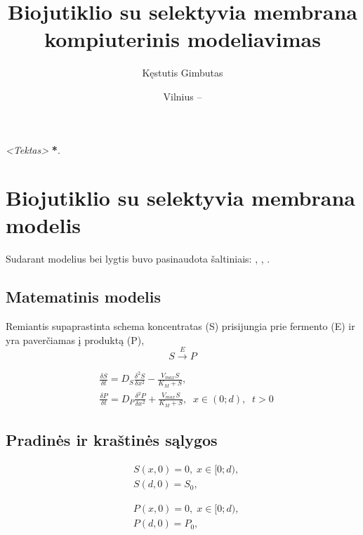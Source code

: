 \documentclass[12pt, a4paper, lithuanian]{article}
\title{Biojutiklio su selektyvia membrana kompiuterinis modeliavimas}
\author{
   Kęstutis Gimbutas
}
\date{Vilnius – \the\year}
\begin{document}
\sloppy
\maketitle

\tableofcontents

\textit{<Tektas>} \textbf{*}.

\section{Biojutiklio su selektyvia membrana modelis}
Sudarant modelius bei lygtis buvo pasinaudota šaltiniais:
\cite{baronas2009mathematical}, \cite{baronas2006computational},
\cite{baronas2003influence}.

\subsection{Matematinis modelis}
Remiantis supaprastinta schema koncentratas (S) prisijungia prie fermento (E)
ir yra
paverčiamas į produktą (P),
\begin{equation}\label{eq:basic} 
    S \overset{E}{\rightarrow} P
\end{equation}

\begin{equation}
\begin{aligned} 
    &\frac{\delta S}{\delta t} = D_S \frac{\delta^2 S}{\delta x^2} -
    \frac{V_{max} S}{K_M + S},\\ 
    &\frac{\delta P}{\delta t} = D_P \frac{\delta^2 P}{\delta x^2} +
    \frac{V_{max} S}{K_M + S} ,\;\; x \in (0; d),\;\; t > 0
\end{aligned}
\end{equation}


\subsection{Pradinės ir kraštinės sąlygos}
\begin{equation}
\begin{aligned}
    &S(x, 0) = 0,\; x \in [0;d),\\
    &S(d, 0) = S_0,
\end{aligned}
\end{equation}

\begin{equation}
\begin{aligned}
    &P(x, 0) = 0,\; x \in [0;d),\\
    &P(d, 0) = P_0,
\end{aligned}
\end{equation}
\end{document}
